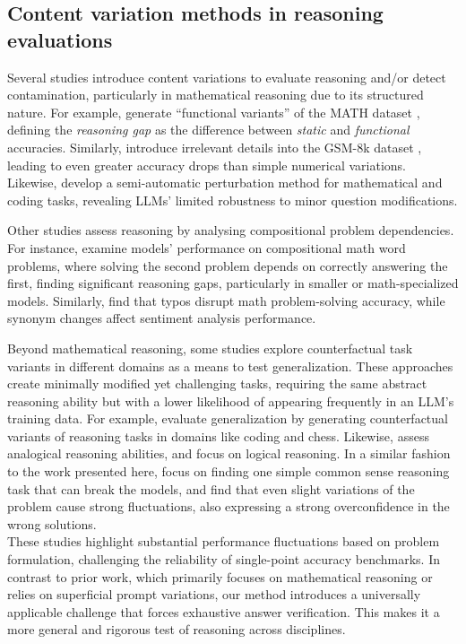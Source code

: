 \subsection{Content variation methods in reasoning evaluations}

Several studies introduce content variations to evaluate reasoning and/or detect contamination, particularly in mathematical reasoning due to its structured nature. For example, \citet{srivastava_functional_2024} generate ``functional variants'' of the MATH dataset \citep{hendrycks2021measuringmathematicalproblemsolving}, defining the \textit{reasoning gap} as the difference between \textit{static} and \textit{functional} accuracies. Similarly, \citet{mirzadeh2024gsmsymbolicunderstandinglimitationsmathematical} introduce irrelevant details into the GSM-8k dataset \citet{cobbe_training_2021}, leading to even greater accuracy drops than simple numerical variations. Likewise, \citet{hong2024evaluatingllmsmathematicalcoding} develop a semi-automatic perturbation method for mathematical and coding tasks, revealing LLMs' limited robustness to minor question modifications.

Other studies assess reasoning by analysing compositional problem dependencies. For instance, \citet{hosseini2024llmreasonerscreatedequal} examine models' performance on compositional math word problems, where solving the second problem depends on correctly answering the first, finding significant reasoning gaps, particularly in smaller or math-specialized models. Similarly, \citet{zhu_promptbench_2023} find that typos disrupt math problem-solving accuracy, while synonym changes affect sentiment analysis performance.

Beyond mathematical reasoning, some studies explore counterfactual task variants in different domains as a means to test generalization. These approaches create minimally modified yet challenging tasks, requiring the same abstract reasoning ability but with a lower likelihood of appearing frequently in an LLM’s training data. For example, \citet{wu2024reasoningrecitingexploringcapabilities} evaluate generalization by generating counterfactual variants of reasoning tasks in domains like coding and chess. Likewise, \citet{lewis2024usingcounterfactualtasksevaluate, lewis2024evaluatingrobustnessanalogicalreasoning} assess analogical reasoning abilities, and \citet{yan2024largelanguagemodelsunderstand} focus on logical reasoning. In a similar fashion to the work presented here, \citet{nezhurina_alice_2024} focus on finding one simple common sense reasoning task that can break the models, and find that even slight variations of the problem cause strong fluctuations, also expressing a strong overconfidence in the wrong solutions.\\

These studies highlight substantial performance fluctuations based on problem formulation, challenging the reliability of single-point accuracy benchmarks. In contrast to prior work, which primarily focuses on mathematical reasoning or relies on superficial prompt variations, our method introduces a universally applicable challenge that forces exhaustive answer verification. This makes it a more general and rigorous test of reasoning across disciplines.